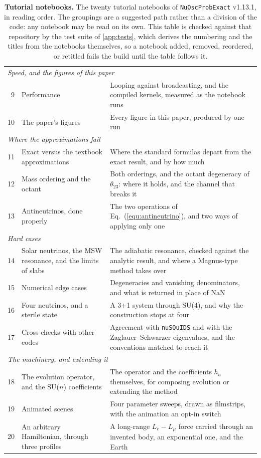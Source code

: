 \documentclass[final,5p,times,twocolumn,sort,compress]{elsarticle}
\newcommand{\eq}{Eq.}
\newcommand{\equ}[1]{\eq~(\ref{equ:#1})}
\begin{document}
{\begin{table}[t!]
{\begin{tabular}{rlp{9.2cm}}
   \multicolumn{3}{l}{\emph{Speed, and the figures of this paper}} \\
   9 & Performance & Looping against broadcasting, and the compiled kernels, measured as the notebook runs \\
   10 & The paper's figures & Every figure in this paper, produced by one run \\
   \multicolumn{3}{l}{\emph{Where the approximations fail}} \\
   11 & Exact versus the textbook approximations & Where the standard formulas depart from the exact result, and by how much \\
   12 & Mass ordering and the octant & Both orderings, and the octant degeneracy of $\theta_{23}$: where it holds, and the channel that breaks it \\
   13 & Antineutrinos, done properly & The two operations of \equ{antineutrino}, and two ways of applying only one \\
   \multicolumn{3}{l}{\emph{Hard cases}} \\
   14 & Solar neutrinos, the MSW resonance, and the limits of slabs & The adiabatic resonance, checked against the analytic result, and where a Magnus-type method takes over \\
   15 & Numerical edge cases & Degeneracies and vanishing denominators, and what is returned in place of NaN \\
   16 & Four neutrinos, and a sterile state & A 3+1 system through SU(4), and why the construction stops at four \\
   17 & Cross-checks with other codes & Agreement with {\tt nuSQuIDS} and with the Zaglauer--Schwarzer eigenvalues, and the conventions matched to reach it \\
   \multicolumn{3}{l}{\emph{The machinery, and extending it}} \\
   18 & The evolution operator, and the SU($n$) coefficients & The operator and the coefficients $h_a$ themselves, for composing evolution or extending the method \\
   19 & Animated scenes & Four parameter sweeps, drawn as filmstrips, with the animation an opt-in switch \\
   20 & An arbitrary Hamiltonian, through three profiles & A long-range $L_e - L_\mu$ force carried through an invented body, an exponential one, and the Earth \\
  \end{tabular}}
  \caption{\label{tab:notebooks}{\bf Tutorial notebooks.} The twenty tutorial notebooks of {\tt NuOscProbExact} v1.13.1, in reading order.  The groupings are a suggested path rather than a division of the code: any notebook may be read on its own.  This table is checked against that repository by the test suite of \ref{app:tests}, which derives the numbering and the titles from the notebooks themselves, so a notebook added, removed, reordered, or retitled fails the build until the table follows it.}
\end{table}
}
\end{document}
